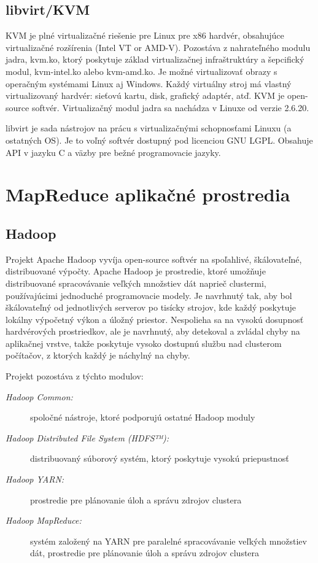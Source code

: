 \documentclass[11pt,final,oneside]{fithesis}
\begin{document}
\subsection{libvirt/KVM}
KVM\footnotemark{} je plné virtualizačné riešenie pre Linux pre x86 hardvér, obsahujúce virtualizačné rozšírenia (Intel VT or AMD-V).
Pozostáva z nahrateľného modulu jadra, kvm.ko, ktorý poskytuje základ virtualizačnej infraštruktúry a šepcifický modul, kvm-intel.ko alebo kvm-amd.ko. Je možné virtualizovať obrazy 
s operačným systémami Linux aj Windows. Každý virtuálny stroj má vlastný virtualizovaný hardvér: sieťovú kartu, disk, grafický adaptér, atď. KVM je open-source softvér. Virtualizačný modul jadra
sa nachádza v Linuxe od verzie 2.6.20.\cite{kvm}

libvirt je sada nástrojov na prácu s virtualizačnými schopnosťami Linuxu (a ostatných OS). Je to voľný softvér dostupný pod licenciou GNU LGPL. 
Obsahuje API v jazyku C a väzby pre bežné programovacie jazyky.\cite{libvirt}


\section{MapReduce aplikačné prostredia}
\subsection{Hadoop}
Projekt Apache Hadoop vyvíja open-source softvér na spoľahlivé, škálovateľné, distribuované výpočty. Apache Hadoop je prostredie, ktoré umožňuje distribuované spracovávanie veľkých množstiev dát
naprieč clustermi, používajúcimi jednoduché programovacie modely. Je navrhnutý tak, aby bol škálovateľný od jednotlivých serverov po tisícky strojov, kde každý poskytuje lokálny výpočetný výkon a úložný priestor.
Nespolieha sa na vysokú dosupnosť hardvérových prostriedkov, ale je navrhnutý, aby detekoval a zvládal chyby na aplikačnej vrstve, takže poskytuje vysoko dostupnú službu nad clusterom počítačov, 
z ktorých každý je náchylný na chyby.

Projekt pozostáva z týchto modulov:
\begin{description}
\item[\emph{Hadoop Common:}] spoločné nástroje, ktoré podporujú ostatné Hadoop moduly
\item[\emph{Hadoop Distributed File System (HDFS™):}] distribuovaný súborový systém, ktorý poskytuje vysokú priepustnosť
\item[\emph{Hadoop YARN:}] prostredie pre plánovanie úloh a správu zdrojov clustera
\item[\emph{Hadoop MapReduce:}] systém založený na YARN pre paralelné spracovávanie veľkých množstiev dát, prostredie pre plánovanie úloh a správu zdrojov clustera
\end{description}
\end{document}
